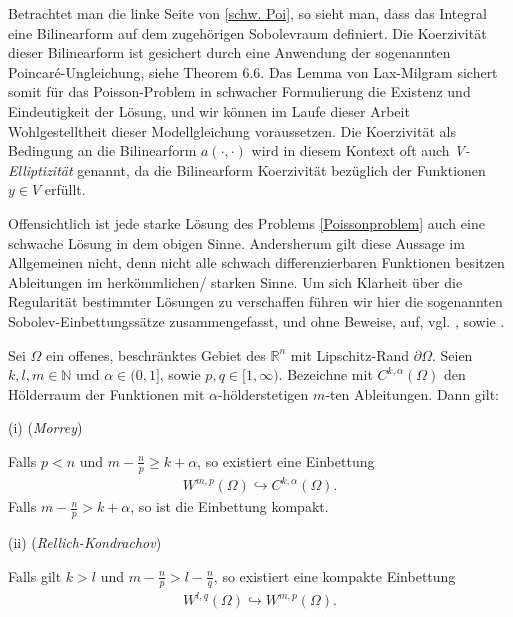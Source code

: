 Betrachtet man die linke Seite von \ref{schw. Poi}, so sieht man, dass das Integral eine Bilinearform auf dem zugehörigen Sobolevraum definiert. Die Koerzivität dieser Bilinearform ist gesichert durch eine Anwendung der sogenannten Poincaré-Ungleichung, siehe \cite{PDE3} Theorem 6.6.
Das Lemma von Lax-Milgram sichert somit für das Poisson-Problem in schwacher Formulierung die Existenz und Eindeutigkeit der Lösung, und wir können im Laufe dieser Arbeit Wohlgestelltheit dieser Modellgleichung voraussetzen. Die Koerzivität als Bedingung an die Bilinearform $a(\cdot, \cdot)$ wird in diesem Kontext oft auch \textit{V-Elliptizität} genannt, da die Bilinearform Koerzivität bezüglich der Funktionen $y\in V$ erfüllt.

Offensichtlich ist jede starke Lösung des Problems \ref{Poissonproblem} auch eine schwache Lösung in dem obigen Sinne. Andersherum gilt diese Aussage im Allgemeinen nicht, denn nicht alle schwach differenzierbaren Funktionen besitzen Ableitungen im herkömmlichen/ starken Sinne. Um sich Klarheit über die Regularität bestimmter Lösungen zu verschaffen führen wir hier die sogenannten Sobolev-Einbettungssätze zusammengefasst, und ohne Beweise, auf, vgl. \cite{PDE3}, sowie \cite{brokenSobolev}.

\begin{theorem}\label{Embeddings}
Sei $\Omega$ ein offenes, beschränktes Gebiet des $\mathbb{R}^n$ mit Lipschitz-Rand $\partial\Omega$. Seien $k,l, m\in \mathbb{N}$ und $\alpha \in (0,1]$, sowie $p,q \in [1,\infty)$. Bezeichne mit $C^{k,\alpha}(\Omega)$ den Hölderraum der Funktionen mit $\alpha$-hölderstetigen $m$-ten Ableitungen. Dann gilt:

(i) (\textit{Morrey})

Falls $p < n$ und $m - \frac{n}{p} \geq k + \alpha$, so existiert eine Einbettung
\begin{align*}
	W^{m, p}(\Omega) \hookrightarrow C^{k, \alpha}(\Omega).
\end{align*}
Falls $m - \frac{n}{p} > k + \alpha$, so ist die Einbettung kompakt.

(ii) (\textit{Rellich-Kondrachov})

Falls gilt $k > l$ und $m - \frac{n}{p} > l - \frac{n}{q}$, so existiert eine kompakte Einbettung
\begin{align*}
	W^{l, q}(\Omega) \hookrightarrow 	W^{m, p}(\Omega).
\end{align*}
\end{theorem}

